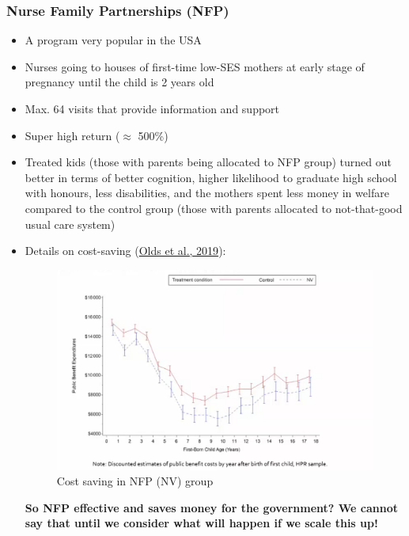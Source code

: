 \subsubsection{Nurse Family Partnerships (NFP)}
\begin{itemize}
    \item A program very popular in the USA
    \item Nurses going to houses of first-time low-SES mothers at early stage of pregnancy until the child is 2 years old
    \item Max. 64 visits that provide information and support
    \item Super high return ($\approx$ 500\%)
    \item Treated kids (those with parents being allocated to NFP group) turned out better in terms of better cognition, higher likelihood to graduate high school with honours, less disabilities, and the mothers spent less money in welfare compared to the control group (those with parents allocated to not-that-good usual care system)
    \item Details on cost-saving (\href{https://publications.aap.org/pediatrics/article/144/6/e20183889/77004/Prenatal-and-Infancy-Nurse-Home-Visiting-Effects}{Olds et al., 2019}):
                    \begin{figure}[H]%
                \centering
                \includegraphics[width=13cm]{images/ch4/NFP cost saving.png}
                \caption{Cost saving in NFP (NV) group}
                \label{Prebirthgradient}
            \end{figure}
\textbf{So NFP effective and saves money for the government? We cannot say that until we consider what will happen if we scale this up!}
\end{itemize}
